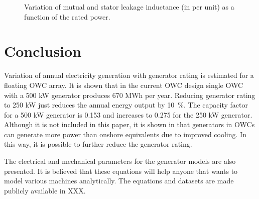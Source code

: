 \documentclass[twocolumn]{article}
\begin{document}
\begin{figure}[]
  \centering

    \caption{Variation of mutual and stator leakage inductance (in per unit) as a function of the rated power.} 
    \label{inductance_plots}
\end{figure}


\section{Conclusion}

Variation of annual electricity generation with generator rating is estimated for a floating OWC array. It is shown that in the current OWC design single OWC with a 500 kW generator produces 670 MWh per year. Reducing generator rating to 250 kW just reduces the annual energy output by 10~\%. The capacity factor for a 500 kW generator is 0.153 and increases to 0.275 for the 250 kW generator. Although it is not included in this paper, it is shown in \cite{Hodgings2010a} that generators in OWCs can generate more power than onshore equivalents due to improved cooling. In this way, it is possible to further reduce the generator rating.

The electrical and mechanical parameters for the generator models are also presented. It is believed that these equations will help anyone that wants to model various machines analytically. The equations and datasets are made publicly available in XXX. 
\end{document}

